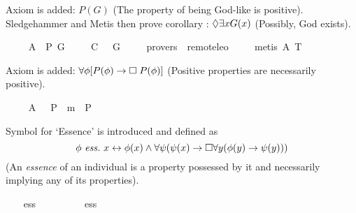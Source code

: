 \begin{isabellebody}
\begin{isamarkuptext}%
Axiom  is added: $P(G)$ (The property of being God-like is positive).
Sledgehammer and Metis then prove corollary : $\Diamond \exists x G(x)$ 
(Possibly, God exists).%
\end{isamarkuptext}%
\isamarkuptrue%
\ \ \isamarkupfalse%
\ \ A{}{\isacharcolon}\ \ {\isachardoublequoteopen}{\isacharbrackleft}P\ G{\isacharbrackright}{\isachardoublequoteclose}\ \isanewline
\isanewline
\ \ \isamarkupfalse%
\ C{\isacharcolon}\ {\isachardoublequoteopen}{\isacharbrackleft}{\isasymdiamond}\ {\isacharparenleft}{\isasymexists}\ G{\isacharparenright}{\isacharbrackright}{\isachardoublequoteclose}\ \isanewline
\ \ \isamarkupfalse%
\ {\isacharbrackleft}provers\ {\isacharequal}\ remote{\isacharunderscore}leo{}{\isacharbrackright}\ \isanewline
%
\isadelimproof
\ \ %
\endisadelimproof
%
\isatagproof
{}\isamarkupfalse%
\ {\isacharparenleft}metis\ A{}\ T{}{\isacharparenright}%
\endisatagproof
{\isafoldproof}%
%
\isadelimproof
%
\endisadelimproof
%
\begin{isamarkuptext}%
Axiom  is added: $\forall \phi [P(\phi) \to \Box \; P(\phi)]$ 
(Positive properties are necessarily positive).%
\end{isamarkuptext}%
\isamarkuptrue%
\ \ \isamarkupfalse%
\ \ A{}{\isacharcolon}\ \ {\isachardoublequoteopen}{\isacharbrackleft}{\isasymforall}{\isacharparenleft}{\isasymlambda}{\isasymPhi}{\isachardot}\ P\ {\isasymPhi}\ m{\isasymrightarrow}\ {\isasymbox}\ {\isacharparenleft}P\ {\isasymPhi}{\isacharparenright}{\isacharparenright}{\isacharbrackright}{\isachardoublequoteclose}%
\begin{isamarkuptext}%
Symbol  for `Essence' is introduced and defined as 
$$\phi \ \mathit{ess.} \ x \leftrightarrow \phi(x) \wedge \forall \psi (\psi(x) \rightarrow \Box \forall y (\phi(y) 
\rightarrow \psi(y)))$$ (An \emph{essence} of an individual is a property possessed by it and necessarily implying any of its properties).%
\end{isamarkuptext}%
\isamarkuptrue%
\ \ \isamarkupfalse%
\ ess\ {\isacharcolon}{\isacharcolon}\ {\isachardoublequoteopen}{\isacharparenleft}{\isasymmu}\ {\isasymRightarrow}\ {\isasymsigma}{\isacharparenright}\ {\isasymRightarrow}\ {\isasymmu}\ {\isasymRightarrow}\ {\isasymsigma}{\isachardoublequoteclose}\ {\isacharparenleft}\ {\isachardoublequoteopen}ess{\isachardoublequoteclose}\ {}{}{\isacharparenright}\ \isanewline

\end{isabellebody}
